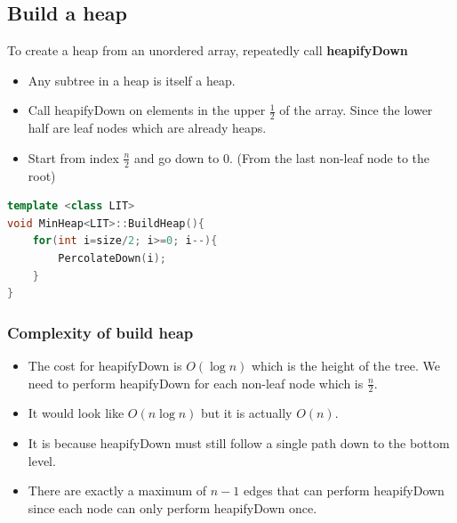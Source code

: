 \documentclass[letterpaper,12pt]{article}
\begin{document}
\subsection{Build a heap}
To create a heap from an unordered array, repeatedly call \textbf{heapifyDown}\begin{itemize}
    \item Any subtree in a heap is itself a heap.
    \item Call heapifyDown on elements in the upper $\frac{1}{2}$ of the array. Since the lower half are leaf nodes which are already heaps.
    \item Start from index $\frac{n}{2}$ and go down to 0. (From the last non-leaf node to the root)
\end{itemize}
\begin{lstlisting}[language=C++]
template <class LIT>
void MinHeap<LIT>::BuildHeap(){
    for(int i=size/2; i>=0; i--){
        PercolateDown(i);
    }
}
\end{lstlisting}
\subsubsection{Complexity of build heap}
\begin{itemize}
    \item The cost for heapifyDown is $O(\log n)$ which is the height of the tree. We need to perform heapifyDown for each non-leaf node which is $\frac{n}{2}$.
    \item It would look like $O(n\log n)$ but it is actually $O(n)$.
    \item It is because heapifyDown must still follow a single path down to the bottom level. 
    \item There are exactly a maximum of $n-1$ edges that can perform heapifyDown since each node can only perform heapifyDown once.
\end{itemize}
\end{document}
